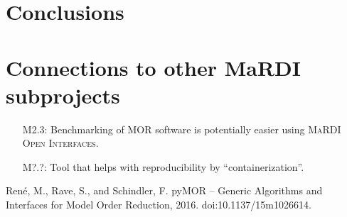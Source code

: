 \documentclass{mmposter}
\newcommand{\OIF}{\textsc{MaRDI Open Interfaces}\xspace}
\begin{document}
\section*{Conclusions}
\lipsum[3]

\section*{Connections to other MaRDI subprojects}

\begin{itemize}[align=left]
  \item[\color{CEmphasis1}M2.3:] Benchmarking of MOR software is potentially
    easier using \OIF{}.
  \item[\color{CEmphasis1}M?.?:] Tool that helps with reproducibility
    by ``containerization''.
\end{itemize}

\begin{thebibliography}{1}
  \setlength{\itemsep}{1pt}
  \setlength{\parskip}{1.5pt}

  \scriptsize{

  Ren{\'{e}}, M., Rave, S., and Schindler, F.
  \newblock pyMOR -- Generic Algorithms and Interfaces for Model Order Reduction, 2016.
  \newblock doi:10.1137/15m1026614.
  }
\end{thebibliography}
\end{document}
